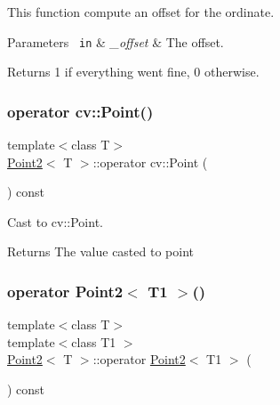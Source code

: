 This function compute an offset for the ordinate. 


\begin{DoxyParams}[1]{Parameters}
\mbox{\texttt{ in}}  & {\em \+\_\+offset} & The offset. \\
\hline
\end{DoxyParams}
\begin{DoxyReturn}{Returns}
1 if everything went fine, 0 otherwise. 
\end{DoxyReturn}
\mbox{\label{class_point2_a0d3f17f7d86d02eae126aa329a20861a}} 
\subsubsection{\texorpdfstring{operator cv::Point()}{operator cv::Point()}}
{\footnotesize\ttfamily template$<$class T$>$ \\
\mbox{\hyperlink{class_point2}{Point2}}$<$ T $>$\+::operator cv\+::\+Point (\begin{DoxyParamCaption}{ }\end{DoxyParamCaption}) const\hspace{0.3cm}{\ttfamily [inline]}}



Cast to cv\+::\+Point. 

\begin{DoxyReturn}{Returns}
The value casted to point 
\end{DoxyReturn}
\mbox{\label{class_point2_a3af3e22d9650f7bde9dd9deeb043dffa}} 
\subsubsection{\texorpdfstring{operator Point2$<$ T1 $>$()}{operator Point2< T1 >()}}
{\footnotesize\ttfamily template$<$class T$>$ \\
template$<$class T1 $>$ \\
\mbox{\hyperlink{class_point2}{Point2}}$<$ T $>$\+::operator \mbox{\hyperlink{class_point2}{Point2}}$<$ T1 $>$ (\begin{DoxyParamCaption}{ }\end{DoxyParamCaption}) const\hspace{0.3cm}{\ttfamily [inline]}}

